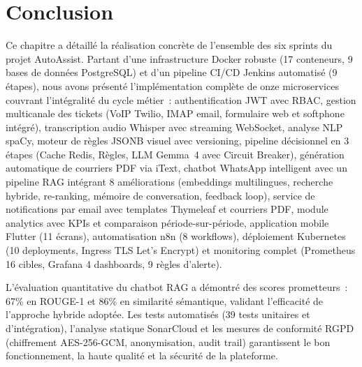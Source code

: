 \section*{Conclusion}
\label{sec:concl3}

Ce chapitre a d\'{e}taill\'{e} la r\'{e}alisation concr\`{e}te de l'ensemble des six sprints du projet AutoAssist. Partant d'une infrastructure Docker robuste (17 conteneurs, 9 bases de donn\'{e}es PostgreSQL) et d'un pipeline CI/CD Jenkins automatis\'{e} (9 \'{e}tapes), nous avons pr\'{e}sent\'{e} l'impl\'{e}mentation compl\`{e}te de onze microservices couvrant l'int\'{e}gralit\'{e} du cycle m\'{e}tier~: authentification JWT avec RBAC, gestion multicanale des tickets (VoIP Twilio, IMAP email, formulaire web et softphone int\'{e}gr\'{e}), transcription audio Whisper avec streaming WebSocket, analyse NLP spaCy, moteur de r\`{e}gles JSONB visuel avec versioning, pipeline d\'{e}cisionnel en 3 \'{e}tapes (Cache Redis, R\`{e}gles, LLM Gemma~4 avec Circuit Breaker), g\'{e}n\'{e}ration automatique de courriers PDF via iText, chatbot WhatsApp intelligent avec un pipeline RAG int\'{e}grant 8 am\'{e}liorations (embeddings multilingues, recherche hybride, re-ranking, m\'{e}moire de conversation, feedback loop), service de notifications par email avec templates Thymeleaf et courriers PDF, module analytics avec KPIs et comparaison p\'{e}riode-sur-p\'{e}riode, application mobile Flutter (11 \'{e}crans), automatisation n8n (8 workflows), d\'{e}ploiement Kubernetes (10 deployments, Ingress TLS Let's Encrypt) et monitoring complet (Prometheus 16 cibles, Grafana 4 dashboards, 9 r\`{e}gles d'alerte).

L'\'{e}valuation quantitative du chatbot RAG a d\'{e}montr\'{e} des scores prometteurs~: 67\% en ROUGE-1 et 86\% en similarit\'{e} s\'{e}mantique, validant l'efficacit\'{e} de l'approche hybride adopt\'{e}e. Les tests automatis\'{e}s (39 tests unitaires et d'int\'{e}gration), l'analyse statique SonarCloud et les mesures de conformit\'{e} RGPD (chiffrement AES-256-GCM, anonymisation, audit trail) garantissent le bon fonctionnement, la haute qualit\'{e} et la s\'{e}curit\'{e} de la plateforme.
